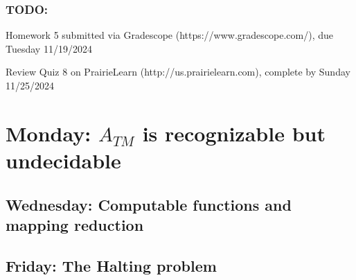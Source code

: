 \vspace{-20pt}

\subsubsection*{TODO:}
\begin{list}{\itemsep-10pt}
   \item Homework 5 submitted via Gradescope (https://www.gradescope.com/), due Tuesday 11/19/2024
   \item Review Quiz 8 on PrairieLearn (http://us.prairielearn.com), complete by Sunday 11/25/2024
\end{list}

\newpage

\section*{Monday: $A_{TM}$ is recognizable but undecidable}


    
\newpage
\subsection*{Wednesday: Computable functions and mapping reduction}




\newpage
\subsection*{Friday: The Halting problem}



\newpage
